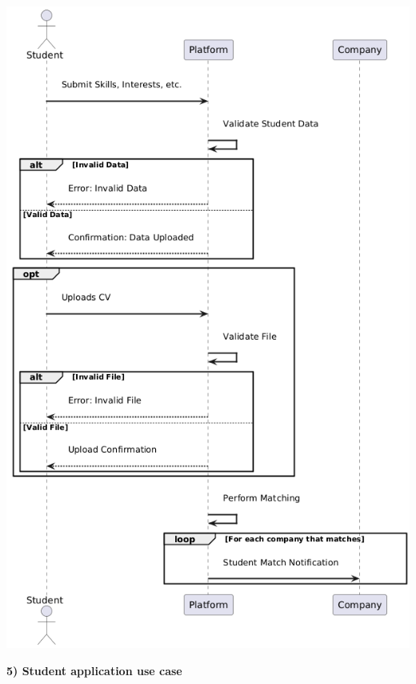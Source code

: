 \begin{center}
    \includegraphics[scale = 0.7]{Images/ImagesRASD/Personal_data_and_CV_upload.png}
\end{center}

\newpage
\textbf{5) Student application use case}\\

